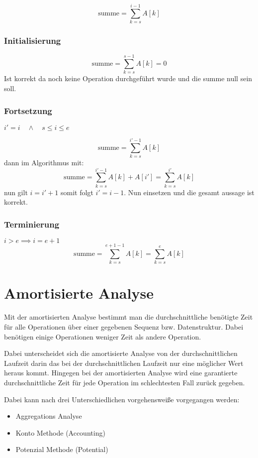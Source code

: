 \documentclass[10pt,a4paper]{article}
\begin{document}
\begin{multicols*}{4}
\[\text{summe}=\sum_{k=s}^{i-1}A[k]\]

\subsubsection*{Initialisierung}
\[\text{summe} = \sum_{k=s}^{s-1}A[k] = 0\]
Ist korrekt da noch keine Operation durchgeführt wurde und die summe null sein soll.

\subsubsection*{Fortsetzung}
\(i' = i \quad\wedge\quad s \leq i \leq e \)

\[\text{summe} = \sum_{k=s}^{i'-1}A[k]\]
dann im Algorithmus mit:
\[\text{summe} = \sum_{k=s}^{i'-1}A[k]+A[i'] = \sum_{k=s}^{i'}A[k]\]
nun gilt \(i=i'+1\) somit folgt \(i'=i-1\). Nun einsetzen und die gesamt aussage ist korrekt.

\subsubsection*{Terminierung}
\(i > e \implies i = e + 1\)
\[\text{summe} = \sum_{k=s}^{e+1-1}A[k] = \sum_{k=s}^{e}A[k]\]

\section{Amortisierte Analyse}
Mit der amortisierten Analyse bestimmt man die durchschnittliche benötigte Zeit für alle Operationen über einer
gegebenen Sequenz bzw. Datenstruktur. Dabei benötigen einige Operationen weniger Zeit als andere Operation.

Dabei unterscheidet sich die amortisierte Analyse von der durchschnittlichen Laufzeit darin das bei der
durchschnittlichen Laufzeit nur eine möglicher Wert heraus kommt. Hingegen bei der amortisierten Analyse wird
eine garantierte durchschnittliche Zeit für jede Operation im schlechtesten Fall zurück gegeben.

Dabei kann nach drei Unterschiedlichen vorgehensweiße vorgegangen werden:
\begin{itemize}
	\item Aggregations Analyse
	\item Konto Methode (Accounting)
	\item Potenzial Methode (Potential)
\end{itemize}

\end{multicols*}
\end{document}
